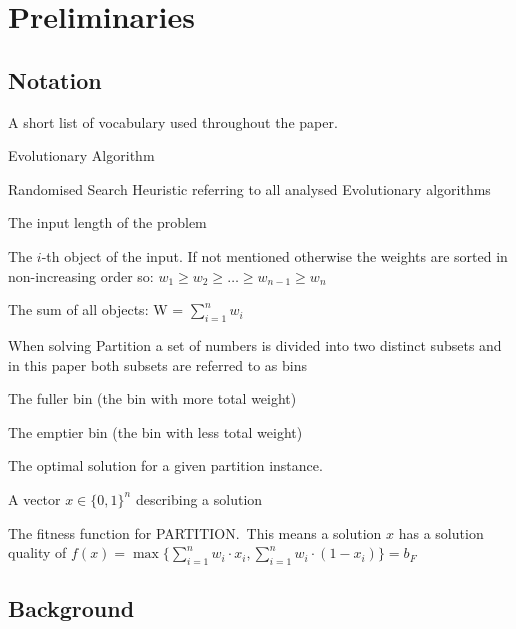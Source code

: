 
\chapter{Preliminaries}\label{ch:preliminaries}

\section{Notation}
A short list of vocabulary used throughout the paper.
\begin{description}[leftmargin=!,labelwidth=\widthof{\bfseries RSH}]
    \item[EA] Evolutionary Algorithm
    \item[RSH] Randomised Search Heuristic referring to all analysed Evolutionary algorithms
    \item[$n$] The input length of the problem
    \item[$w_i$] The $i$-th object of the input. If not mentioned otherwise the weights are sorted in non-increasing order so: \(w_1 \ge w_2 \ge \ldots \ge w_{n-1} \ge w_{n}\)
    \item[$W$] The sum of all objects: W = $\sum_{i=1}^{n}w_i$
    \item[bin] When solving Partition a set of numbers is divided into two distinct subsets and in this paper both subsets are referred to as bins
    \item[$b_F$] The fuller bin (the bin with more total weight)
    \item[$b_E$] The emptier bin (the bin with less total weight)
    \item[$opt$] The optimal solution for a given partition instance.
    \item[$x$] A vector $x \in {\{0, 1\}}^n$ describing a solution
    \item[$f(x)$] The fitness function for PARTITION.\ This means a solution $x$ has a solution quality of \(f(x)=\max\{\sum_{i=1}^{n}w_i\cdot x_i, \sum_{i=1}^{n}w_i\cdot(1-x_i)\}=b_F\)
\end{description}

\section{Background}
